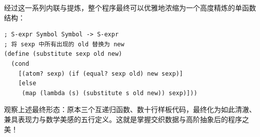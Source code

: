 经过这一系列内联与提炼，整个程序最终可以优雅地浓缩为一个高度精炼的单函数结构：

\begin{lstlisting}[language=BSL]
; S-expr Symbol Symbol -> S-expr
; 将 sexp 中所有出现的 old 替换为 new
(define (substitute sexp old new)
  (cond
    [(atom? sexp) (if (equal? sexp old) new sexp)]
    [else
     (map (lambda (s) (substitute s old new)) sexp)]))
\end{lstlisting}

观察上述最终形态：原本三个互递归函数、数十行样板代码，最终化为如此清澈、兼具表现力与数学美感的五行定义。这就是掌握交织数据与高阶抽象后的程序之美！
